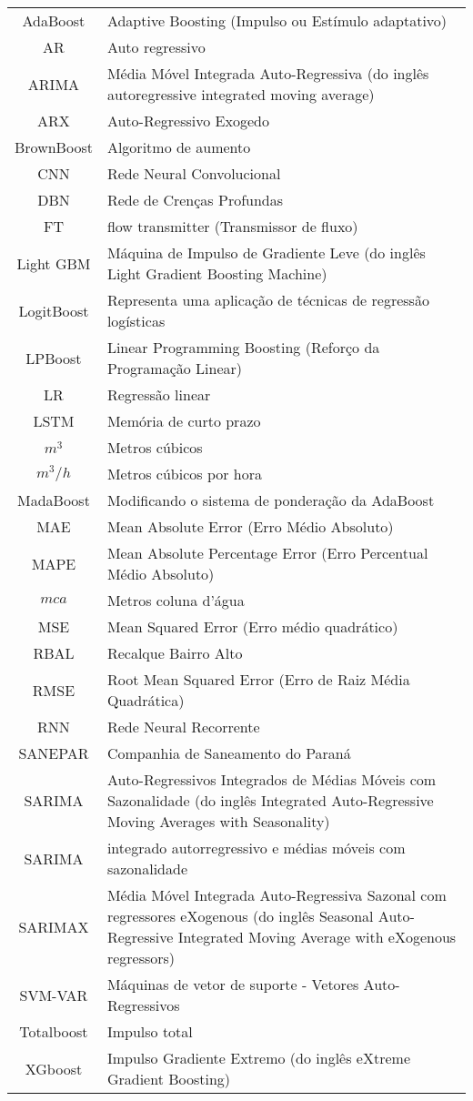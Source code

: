 \begin{tabular}{cp{}}
AdaBoost & Adaptive Boosting (Impulso ou Estímulo adaptativo)\\
AR & Auto regressivo\\
ARIMA & Média Móvel Integrada Auto-Regressiva (do inglês autoregressive integrated moving average) \\
ARX & Auto-Regressivo Exogedo\\ 
BrownBoost & Algoritmo de aumento\\
CNN & Rede Neural Convolucional\\
DBN & Rede de Crenças Profundas \\
FT & flow transmitter (Transmissor de fluxo)\\
Light GBM & Máquina de Impulso de Gradiente Leve (do inglês Light Gradient Boosting Machine) \\
LogitBoost & Representa uma aplicação de técnicas de regressão logísticas\\
LPBoost & Linear Programming Boosting (Reforço da Programação Linear)\\
LR & Regressão linear\\
LSTM & Memória de curto prazo\\
$ m^3 $ & Metros cúbicos\\
$ m^3/h $ & Metros cúbicos por hora\\
MadaBoost & Modificando o sistema de ponderação da AdaBoost\\
MAE & Mean Absolute Error (Erro Médio Absoluto)\\
MAPE &  Mean Absolute Percentage Error (Erro Percentual Médio Absoluto)\\
$ mca $ & Metros coluna d’água\\
MSE & Mean Squared Error (Erro médio quadrático)\\
RBAL & Recalque Bairro Alto\\
RMSE & Root Mean Squared Error (Erro de Raiz Média Quadrática)\\
RNN & Rede Neural Recorrente\\
SANEPAR & Companhia de Saneamento do Paraná \\
SARIMA & Auto-Regressivos Integrados de Médias Móveis com Sazonalidade (do inglês Integrated Auto-Regressive Moving Averages with Seasonality) \\
SARIMA & integrado autorregressivo e médias móveis com sazonalidade\\
SARIMAX &  Média Móvel Integrada Auto-Regressiva Sazonal com regressores eXogenous (do inglês Seasonal Auto-Regressive Integrated Moving Average with eXogenous regressors) \\
SVM-VAR & Máquinas de vetor de suporte - Vetores Auto-Regressivos\\
Totalboost & Impulso total\\
XGboost & Impulso Gradiente Extremo (do inglês eXtreme Gradient Boosting) 
\end{tabular}




